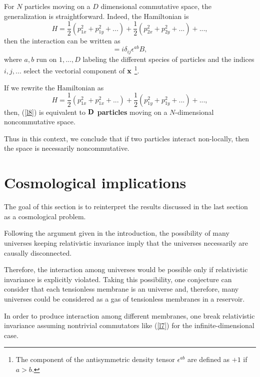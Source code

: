 \documentclass[a4paper,aps,twocolumn,amsfonts]{revtex4}
\begin{document}
   For $N$ particles moving on a $D$ dimensional  commutative space, the generalization is straightforward. Indeed,  the Hamiltonian is 
   \begin{equation}
   H =  \frac{1}{2} (p^2_{1x} +p^2_{1y}+ ...) + \frac{1}{2} (p^2_{2x} +p^2_{2y}+ ...) + ... ,  \label{l6}
   \end{equation}
    then the interaction can be written as 
   \begin{equation}
   [ p_i^a, p_j^b] = i \delta_{ij} \epsilon^{ab} B, \label{l7}
   \end{equation}
   where $a,b$ run on  $1, ...,D$ labeling the different species of particles and the indices $i,j, ...$ select the vectorial component of 
   ${\bf x}$  \footnote{The component of the antisymmetric density tensor $\epsilon^{ab}$ are  defined as $+1$ if $a>b$.}.

   If we rewrite the Hamiltonian as
   \begin{equation}
   H =  \frac{1}{2} (p^2_{1x} +p^2_{1x}+ ...) + \frac{1}{2} (p^2_{1y} +p^2_{1y}+ ...) + ... ,  \label{l8}
   \end{equation}
   then, (\ref{l8}) is equivalent to {\bf ${\bf D}$ particles} moving on a $N$-dimensional  noncommutative space.

   Thus in this context, we conclude that if two particles interact non-locally, then the space is necessarily noncommutative.

   \section{Cosmological implications}

   The goal of this section is to reinterpret the results discussed in the last section as a cosmological problem.

   Following the argument given in the introduction, the possibility of many universes keeping  relativistic invariance imply that the universes necessarily are causally disconnected.

   Therefore, the interaction among universes would be possible only if relativistic  invariance is explicitly violated. Taking this possibility, one conjecture can consider that each tensionless membrane is an universe and, therefore,  many universes could be considered as a gas of tensionless membranes in a reservoir.

   In order to produce interaction among different membranes, one break relativistic invariance assuming nontrivial commutators like 
   (\ref{l7})  for the infinite-dimensional case. 
   
\end{document}
